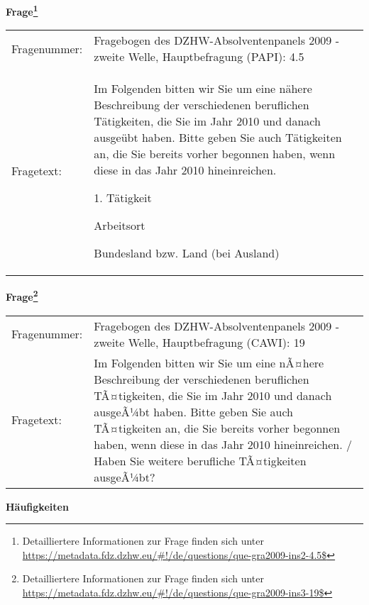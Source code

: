 				\vspace*{0.5cm}
                \noindent\textbf{Frage\footnote{Detailliertere Informationen zur Frage finden sich unter
		              \url{https://metadata.fdz.dzhw.eu/\#!/de/questions/que-gra2009-ins2-4.5$}}}\\
				\begin{tabularx}{\hsize}{@{}lX}
					Fragenummer: &
					  Fragebogen des DZHW-Absolventenpanels 2009 - zweite Welle, Hauptbefragung (PAPI):
					  4.5
 \\
					Fragetext: & Im Folgenden bitten wir Sie um eine nähere Beschreibung der verschiedenen beruflichen Tätigkeiten, die Sie im Jahr 2010 und danach ausgeübt haben. Bitte geben Sie auch Tätigkeiten an, die Sie bereits vorher begonnen haben, wenn diese in das Jahr 2010 hineinreichen.\par  1. Tätigkeit\par  Arbeitsort\par  Bundesland bzw. Land (bei Ausland) \\
				\end{tabularx}
				\vspace*{0.5cm}
                \noindent\textbf{Frage\footnote{Detailliertere Informationen zur Frage finden sich unter
		              \url{https://metadata.fdz.dzhw.eu/\#!/de/questions/que-gra2009-ins3-19$}}}\\
				\begin{tabularx}{\hsize}{@{}lX}
					Fragenummer: &
					  Fragebogen des DZHW-Absolventenpanels 2009 - zweite Welle, Hauptbefragung (CAWI):
					  19
 \\
					Fragetext: & Im Folgenden bitten wir Sie um eine nÃ¤here Beschreibung der verschiedenen beruflichen TÃ¤tigkeiten, die Sie im Jahr 2010 und danach ausgeÃ¼bt haben. Bitte geben Sie auch TÃ¤tigkeiten an, die Sie bereits vorher begonnen haben, wenn diese in das Jahr 2010 hineinreichen. / Haben Sie weitere berufliche TÃ¤tigkeiten ausgeÃ¼bt? \\
				\end{tabularx}





        		\vspace*{0.5cm}
                \noindent\textbf{Häufigkeiten}

